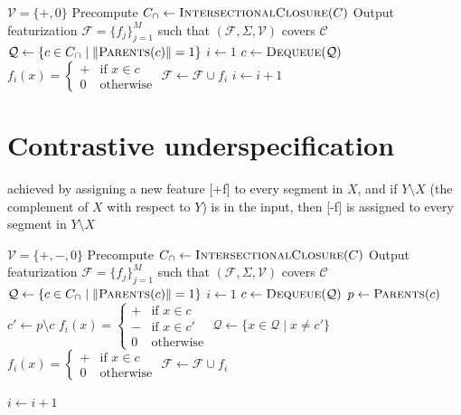 \documentclass[11pt, oneside]{article}   	%
\begin{document}
\vspace{\baselineskip} \noindent \begin{algorithmic}
	\REQUIRE $\mathcal V = \{ +, 0 \}$
	\REQUIRE Precompute $C_\cap \leftarrow \textsc{IntersectionalClosure}(C)$
	\ENSURE Output featurization $\mathcal F = \{ f_j \}_{j=1}^M$ such that $(\mathcal F, \Sigma, \mathcal V)$ covers $\mathcal C$
	\STATE
	\STATE $\mathcal Q \leftarrow \{c \in C_\cap \mid \Vert\textsc{Parents}(c)\Vert = 1 \}$
	\STATE $i \leftarrow 1$
	\STATE
	\STATE $c \leftarrow \textsc{Dequeue}(\mathcal Q)$
	\STATE $f_i(x) = \begin{cases}
	+ & \mbox{if } x \in c \\
	0 & \mbox{otherwise}
	\end{cases} $
	\STATE $\mathcal F \leftarrow \mathcal F \cup f_i$
	\STATE $i \leftarrow i + 1$
	\ENDWHILE
\end{algorithmic}

\section{Contrastive underspecification}
achieved by assigning a new feature [+f] to every segment in $X$, and if $Y \setminus X$ (the complement of $X$ with respect to $Y$) is in the input, then [-f] is assigned to every segment in $Y \setminus X$

\vspace{\baselineskip} \noindent \begin{algorithmic}
	\REQUIRE $\mathcal V = \{ +, -, 0 \}$
	\REQUIRE Precompute $C_\cap \leftarrow \textsc{IntersectionalClosure}(C)$
	\ENSURE Output featurization $\mathcal F = \{ f_j \}_{j=1}^M$ such that $(\mathcal F, \Sigma, \mathcal V)$ covers $\mathcal C$
	\STATE
	\STATE $\mathcal Q \leftarrow \{c \in C_\cap \mid \Vert\textsc{Parents}(c)\Vert = 1 \}$
	\STATE $i \leftarrow 1$
	\STATE
	\STATE $c \leftarrow \textsc{Dequeue}(\mathcal Q)$
	\STATE $p \leftarrow \textsc{Parents}(c)$
	\STATE $c' \leftarrow p \setminus c$
	\STATE $f_i(x) = \begin{cases}
	+ & \mbox{if } x \in c \\
	- & \mbox{if } x \in c' \\
	0 & \mbox{otherwise}
	\end{cases} $
	\STATE $\mathcal Q \leftarrow \{x \in \mathcal Q \mid x \not= c' \}$
	\ELSE
	\STATE $f_i(x) = \begin{cases}
	+ & \mbox{if } x \in c \\
	0 & \mbox{otherwise}
	\end{cases} $
	\ENDIF
	\STATE $\mathcal F \leftarrow \mathcal F \cup f_i$
	
	\STATE $i \leftarrow i + 1$
	\ENDWHILE
\end{algorithmic}
\end{document}
